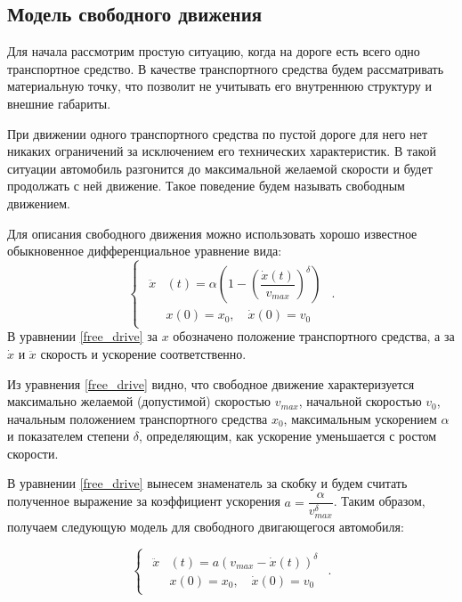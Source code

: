 \documentclass[12pt, a4paper]{extarticle}
\numberwithin{equation}{section}
\numberwithin{figure}{section}
\begin{document}
\subsection{Модель свободного движения}

Для начала рассмотрим простую ситуацию, когда на дороге есть всего одно транспортное средство. В качестве транспортного средства будем рассматривать материальную точку, что позволит не учитывать его внутреннюю структуру и внешние габариты. 

При движении одного транспортного средства по пустой дороге для него нет никаких ограничений за исключением его технических характеристик. В такой ситуации автомобиль разгонится до максимальной желаемой скорости и будет продолжать с ней движение. Такое поведение будем называть свободным движением. 

Для описания свободного движения можно использовать хорошо известное обыкновенное дифференциальное уравнение вида: 
\begin{equation} \label{free_drive}
\begin{cases}
\begin{split}
\ddot{x}&(t) = \alpha\left( 1-\left( \dfrac{\dot{x}(t)}{v_{max}}\right)^\delta \right) \\
&x(0)=x_0, \quad \dot{x}(0)=v_{0}
\end{split}
\end{cases}.
\end{equation}
В уравнении \eqref{free_drive} за $x$ обозначено положение транспортного средства, а за $\dot{x}$ и $\ddot{x}$ скорость и ускорение соответственно.

Из уравнения \eqref{free_drive} видно, что свободное движение характеризуется максимально желаемой (допустимой) скоростью $v_{max}$, начальной скоростью $v_{0}$, начальным положением транспортного средства $x_0$, максимальным ускорением $\alpha$ и показателем степени $\delta$, определяющим, как ускорение уменьшается с ростом скорости.

В уравнении \eqref{free_drive} вынесем знаменатель за скобку и будем считать полученное выражение за коэффициент ускорения $a=\dfrac{\alpha}{v_{max}^\delta}$. Таким образом, получаем следующую модель для свободного двигающегося автомобиля:

\begin{equation} \label{free_drive_with_initial_conditions}
\begin{cases}
\begin{split}
\ddot{x}&(t) = a\left( v_{max} - \dot{x}(t)\right)^\delta \\
&x(0)=x_0, \quad \dot{x}(0)=v_0
\end{split}
\end{cases}.
\end{equation}
\end{document}
